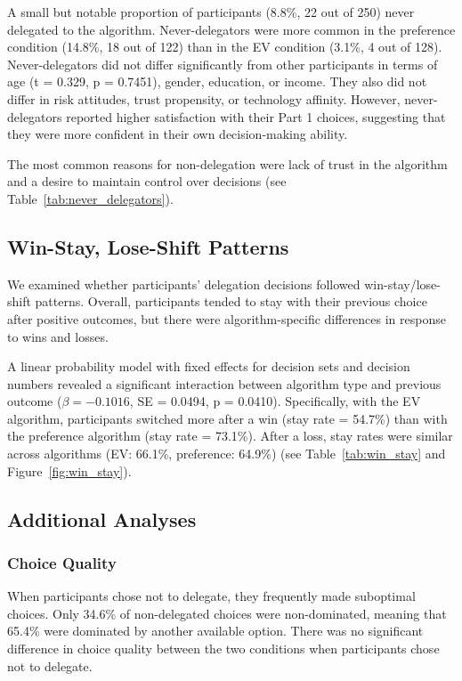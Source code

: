 A small but notable proportion of participants (8.8\%, 22 out of 250) never delegated to the algorithm. Never-delegators were more common in the preference condition (14.8\%, 18 out of 122) than in the EV condition (3.1\%, 4 out of 128). Never-delegators did not differ significantly from other participants in terms of age (t = 0.329, p = 0.7451), gender, education, or income. They also did not differ in risk attitudes, trust propensity, or technology affinity. However, never-delegators reported higher satisfaction with their Part 1 choices, suggesting that they were more confident in their own decision-making ability.

The most common reasons for non-delegation were lack of trust in the algorithm and a desire to maintain control over decisions (see Table~\ref{tab:never_delegators}).

\subsection{Win-Stay, Lose-Shift Patterns}

We examined whether participants' delegation decisions followed win-stay/lose-shift patterns. Overall, participants tended to stay with their previous choice after positive outcomes, but there were algorithm-specific differences in response to wins and losses.

A linear probability model with fixed effects for decision sets and decision numbers revealed a significant interaction between algorithm type and previous outcome ($\beta = -0.1016$, SE = 0.0494, p = 0.0410). Specifically, with the EV algorithm, participants switched more after a win (stay rate = 54.7\%) than with the preference algorithm (stay rate = 73.1\%). After a loss, stay rates were similar across algorithms (EV: 66.1\%, preference: 64.9\%) (see Table~\ref{tab:win_stay} and Figure~\ref{fig:win_stay}).

\subsection{Additional Analyses}

\subsubsection{Choice Quality}

When participants chose not to delegate, they frequently made suboptimal choices. Only 34.6\% of non-delegated choices were non-dominated, meaning that 65.4\% were dominated by another available option. There was no significant difference in choice quality between the two conditions when participants chose not to delegate.

